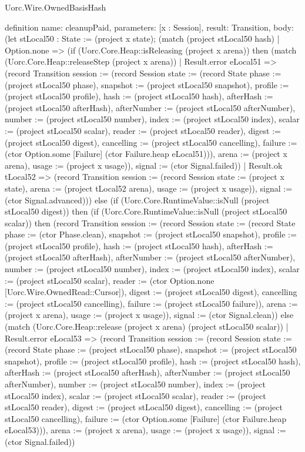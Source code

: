 \begin{lexlean}{Uorc.Wire.OwnedBasisHash}
\begin{semanticmodule}
definition{
  name: cleanupPaid,
  parameters: [x : Session],
  result: Transition,
  body: (let stLocal50 : State := (project x state); (match (project stLocal50 hash)
    | Option.none => (if (Uorc.Core.Heap::isReleasing (project x arena)) then (match (Uorc.Core.Heap::releaseStep (project x arena))
      | Result.error eLocal51 => (record Transition {session := (record Session {state := (record State {phase := (project stLocal50 phase), snapshot := (project stLocal50 snapshot), profile := (project stLocal50 profile), hash := (project stLocal50 hash), afterHash := (project stLocal50 afterHash), afterNumber := (project stLocal50 afterNumber), number := (project stLocal50 number), index := (project stLocal50 index), scalar := (project stLocal50 scalar), reader := (project stLocal50 reader), digest := (project stLocal50 digest), cancelling := (project stLocal50 cancelling), failure := (ctor Option.some [Failure] (ctor Failure.heap eLocal51))}), arena := (project x arena), usage := (project x usage)}), signal := (ctor Signal.failed)})
      | Result.ok tLocal52 => (record Transition {session := (record Session {state := (project x state), arena := (project tLocal52 arena), usage := (project x usage)}), signal := (ctor Signal.advanced)})) else (if (Uorc.Core.RuntimeValue::isNull (project stLocal50 digest)) then (if (Uorc.Core.RuntimeValue::isNull (project stLocal50 scalar)) then (record Transition {session := (record Session {state := (record State {phase := (ctor Phase.clean), snapshot := (project stLocal50 snapshot), profile := (project stLocal50 profile), hash := (project stLocal50 hash), afterHash := (project stLocal50 afterHash), afterNumber := (project stLocal50 afterNumber), number := (project stLocal50 number), index := (project stLocal50 index), scalar := (project stLocal50 scalar), reader := (ctor Option.none [Uorc.Wire.OwnedRead::Cursor]), digest := (project stLocal50 digest), cancelling := (project stLocal50 cancelling), failure := (project stLocal50 failure)}), arena := (project x arena), usage := (project x usage)}), signal := (ctor Signal.clean)}) else (match (Uorc.Core.Heap::release (project x arena) (project stLocal50 scalar))
      | Result.error eLocal53 => (record Transition {session := (record Session {state := (record State {phase := (project stLocal50 phase), snapshot := (project stLocal50 snapshot), profile := (project stLocal50 profile), hash := (project stLocal50 hash), afterHash := (project stLocal50 afterHash), afterNumber := (project stLocal50 afterNumber), number := (project stLocal50 number), index := (project stLocal50 index), scalar := (project stLocal50 scalar), reader := (project stLocal50 reader), digest := (project stLocal50 digest), cancelling := (project stLocal50 cancelling), failure := (ctor Option.some [Failure] (ctor Failure.heap eLocal53))}), arena := (project x arena), usage := (project x usage)}), signal := (ctor Signal.failed)})
}
\end{semanticmodule}
\end{lexlean}
